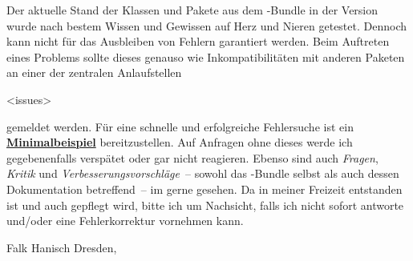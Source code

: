 Der aktuelle Stand der Klassen und Pakete aus dem \TUDScript-Bundle in der 
Version~\vTUDScript{} wurde nach bestem Wissen und Gewissen auf Herz und Nieren 
getestet. Dennoch kann nicht für das Ausbleiben von Fehlern garantiert werden. 
Beim Auftreten eines Problems sollte dieses genauso wie Inkompatibilitäten mit 
anderen Paketen an einer der zentralen Anlaufstellen
\begin{quoting}
\renewcommand*\href[2]{\url{#1}\quad(#2)}
\GitHubRepo<issues>\newline\Forum%
\end{quoting}
gemeldet werden. Für eine schnelle und erfolgreiche Fehlersuche ist ein 
\href{http://www.komascript.de/minimalbeispiel}{\textbf{Minimalbeispiel}} 
bereitzustellen. Auf Anfragen ohne dieses werde ich gegebenenfalls verspätet 
oder gar nicht reagieren. Ebenso sind auch \emph{Fragen}, \emph{Kritik} und 
\emph{Verbesserungsvorschläge}~-- sowohl das \TUDScript-Bundle selbst als auch 
dessen Dokumentation betreffend~-- im \TUDForum gerne gesehen. Da \TUDScript in 
meiner Freizeit entstanden ist und auch gepflegt wird, bitte ich um Nachsicht, 
falls ich nicht sofort antworte und/oder eine Fehlerkorrektur vornehmen kann.

\bigskip\bigskip
\noindent Falk Hanisch\newline
Dresden, 
